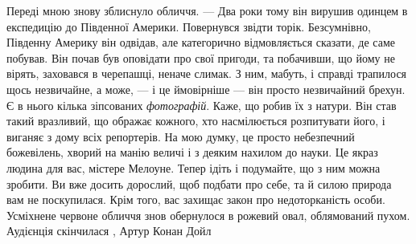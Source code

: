 Переді мною знову зблиснуло обличчя. — Два роки тому він вирушив одинцем в
експедицію до Південної Америки.  Повернувся звідти торік. Безсумнівно,
Південну Америку він одвідав, але категорично відмовляється сказати, де саме
побував. Він почав був оповідати про свої пригоди, та побачивши, що йому не
вірять, заховався в черепашці, неначе слимак. З ним, мабуть, і справді
трапилося щось незвичайне, а може, — і це ймовірніше — він просто незвичайний
брехун. Є в нього кілька зіпсованих \emph{фотографій}. Каже, що робив їх з
натури. Він став такий вразливий, що ображає кожного, хто насмілюється
розпитувати його, і виганяє з дому всіх репортерів.  На мою думку, це просто
небезпечний божевілень, хворий на манію величі і з деяким нахилом до науки. Це
якраз людина для вас, містере Мелоуне. Тепер ідіть і подумайте, що з ним можна
зробити. Ви вже досить дорослий, щоб подбати про себе, та й силою природа вам
не поскупилася. Крім того, вас захищає закон про недоторканість особи.
Усміхнене червоне обличчя знов обернулося в рожевий овал, облямований пухом.
Аудієнція скінчилася
, Артур Конан Дойл

